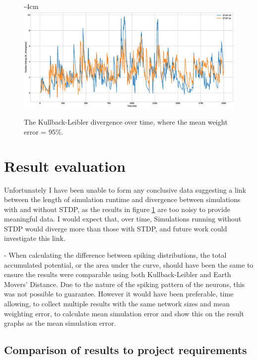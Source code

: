 \begin{figure}[h!]
    \centering
    \addtolength{\leftskip} {-4cm}
    \addtolength{\rightskip}{-4cm}
    \includegraphics[width=1.6\linewidth]{figures/graphs/RESULT2.eps}
    \caption[KL divergence over time, mean weight error = 95\%]{The Kullback-Leibler divergence over time, where the mean weight error = 95\%.}
    \label{fig:RES2}
\end{figure}
\FloatBarrier

\section{Result evaluation}

Unfortunately I have been unable to form any conclusive data suggesting a link
between the length of simulation runtime and divergence between simulations with
and without STDP, as the results in figure \ref{fig:RES2} are too noisy to
provide meaningful data. I would expect that, over time, Simulations running
without STDP would diverge more than those with STDP, and future work could
investigate this link.

- When calculating the difference between spiking distributions, the total
accumulated potential, or the area under
the curve, should have been the same to ensure
the results were comparable using both Kullback-Leibler and Earth Movers'
Distance. Due to the nature of the spiking pattern of the neurons, this was not
possible to guarantee. However it would have been preferable, time allowing, to
collect multiple results with the same network sizes and mean weighting error,
to calculate mean simulation error and show this on the result graphs as the
mean simulation error.

\subsection{Comparison of results to project requirements}

